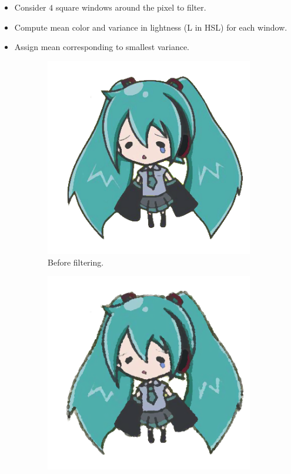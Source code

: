 \documentclass{beamer}
\begin{document}
\begin{frame}
\begin{itemize}
\item Consider $4$ square windows around the pixel to filter.
\item Compute mean color and variance in lightness (L in HSL) for each window.
\item Assign mean corresponding to smallest variance.
\end{itemize}

\begin{figure}[htb!]
\centering
\begin{subfigure}{.24\textwidth}
\includegraphics[width=\textwidth]{../images/miku_d.png}
\caption{Before filtering.}
\end{subfigure}
\begin{subfigure}{.24\textwidth}
\includegraphics[width=\textwidth]{../images/miku_d_filtered_smallh.png}

\end{subfigure}
\end{figure}
\end{frame}
\end{document}
